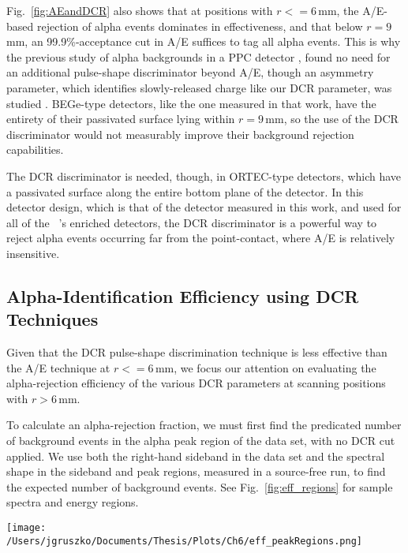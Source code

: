 Fig.~\ref{fig:AEandDCR} also shows that at positions with $r<= 6$\,mm, the A/E-based rejection of alpha events dominates in effectiveness, and that below $r=9$\,mm, an 99.9\%-acceptance cut in A/E suffices to tag all alpha events. This is why the previous study of alpha backgrounds in a PPC detector \cite{Agostini_thesis}, found no need for an additional pulse-shape discriminator beyond A/E, though an asymmetry parameter, which identifies slowly-released charge like our DCR parameter, was studied \cite{TUBEdoc?}. BEGe-type detectors, like the one measured in that work, have the entirety of their passivated surface lying within $r=9$\,mm, so the use of the DCR discriminator would not measurably improve their background rejection capabilities. 

The DCR discriminator is needed, though, in ORTEC-type detectors, which have a passivated surface along the entire bottom plane of the detector. In this detector design, which is that of the detector measured in this work, and used for all of the \MJ\ \DEM 's enriched detectors, the DCR discriminator is a powerful way to reject alpha events occurring far from the point-contact, where A/E is relatively insensitive. 

\subsection{Alpha-Identification Efficiency using DCR Techniques}
Given that the DCR pulse-shape discrimination technique is less effective than the A/E technique at $r<=6$\,mm, we focus our attention on evaluating the alpha-rejection efficiency of the various DCR parameters at scanning positions with $r>6$\,mm. 

To calculate an alpha-rejection fraction, we must first find the predicated number of background events in the alpha peak region of the data set, with no DCR cut applied. We use both the right-hand sideband in the data set and the spectral shape in the sideband and peak regions, measured in a source-free run, to find the expected number of background events. See Fig.~\ref{fig:eff_regions} for sample spectra and energy regions. 

\begin{figure*}[]
 \centering
 \texttt{[image: /Users/jgruszko/Documents/Thesis/Plots/Ch6/eff\_peakRegions.png]}
 \caption[Energy spectra, showing the windows used to calculate the DCR alpha rejection efficiency]{Energy spectra for a source scan data set with $r=9$\,mm {\it (left)} and a background data set {\it (right)}. The energy windows indicated are the $5\sigma$ peak region, in red, and the 500\,keV right-hand sideband, in blue. $n_{s, pk}$ is the sum of all events in the red solid-lined box and $n_{s, rh}$ is the sum of all the events in the blue solid-lined box. $n_{b, pk}$ and $n_{b, rh}$ are the sum of events in the red and blue dashed-line boxes, respectively.} 
 \label{fig:eff_regions}
\end{figure*}

